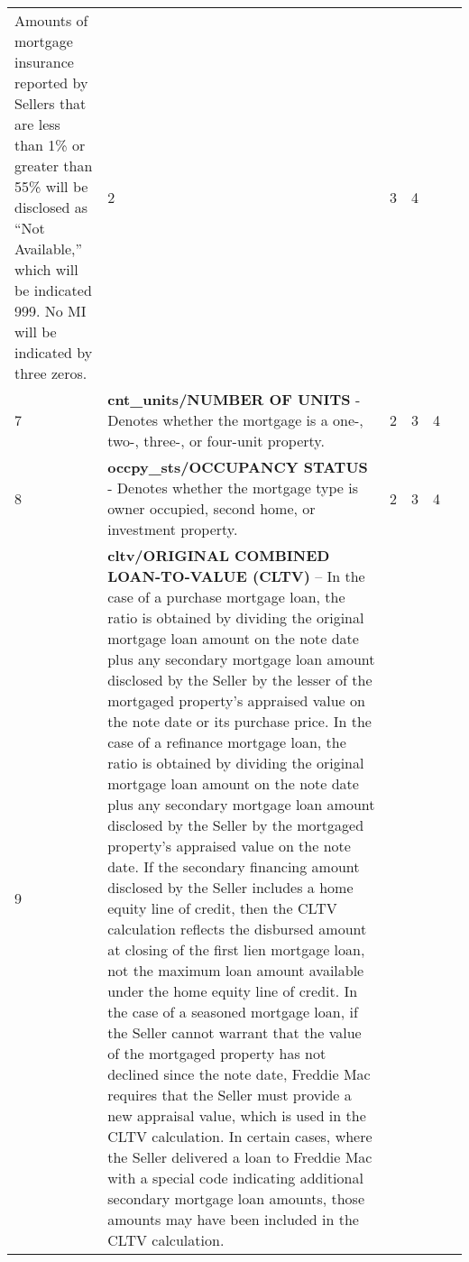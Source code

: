 \begin{center}
\begin{longtable}{@{}
>{\raggedright}p{.3cm}
p{6.5cm}
>{\raggedright}p{3cm}
>{\raggedright}p{1.5cm}p{1.5cm}@{}
p{1cm}
@{}}
Amounts of mortgage insurance reported by Sellers that are less than 1\% or greater than 55\% will be disclosed as “Not Available,” which will be indicated 999. No MI will be indicated by three zeros. & \tiny 2 & \tiny  3 & \tiny 4 \\ 
\tiny 7 & \tiny \textbf{cnt\_units/NUMBER OF UNITS} - Denotes whether the mortgage is a one-, two-, three-, or four-unit property. & \tiny 2 & \tiny  3& 4\tiny  \\ 
\tiny 8 & \tiny \textbf{occpy\_sts/OCCUPANCY STATUS} - Denotes whether the mortgage type is  owner occupied, second home, or investment property. & \tiny 2 & \tiny  3 & \tiny 4 \\
\tiny 9 & \tiny \textbf{cltv/ORIGINAL COMBINED LOAN-TO-VALUE (CLTV)} – In the case of a purchase mortgage loan, the ratio is obtained by dividing the original mortgage loan amount on the note date plus any secondary mortgage loan amount disclosed by the Seller by the lesser of the mortgaged property’s appraised value on the note date or its purchase price. In the case of a refinance mortgage loan, the ratio is obtained by dividing the original mortgage loan amount on the note date plus any secondary mortgage loan amount disclosed by the Seller by the mortgaged property’s appraised value on the note date. If the secondary financing amount disclosed by the Seller includes a home equity line of credit, then the CLTV calculation reflects the disbursed amount at closing of the first lien mortgage loan, not the maximum loan amount available under the home equity line of credit. In the case of a seasoned mortgage loan, if the Seller cannot warrant that the value of the mortgaged property has not declined since the note date, Freddie Mac requires that the Seller must provide a new appraisal value, which is used in the CLTV calculation. In certain cases, where the Seller delivered a loan to Freddie Mac with a special code indicating additional secondary mortgage loan amounts, those amounts may have been included in the CLTV calculation.



\end{longtable}
\end{center}
